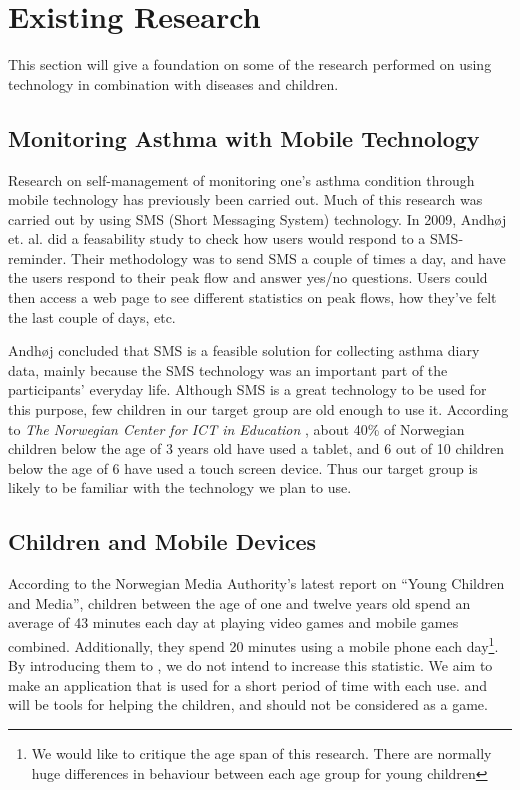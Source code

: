 \section{Existing Research}
\label{sec:existing-research}

This section will give a foundation on some of the research performed on using technology in combination with diseases and children. 


\subsection{Monitoring Asthma with Mobile Technology}
\label{sec:monitoringasthma}
Research on self-management of monitoring one's asthma condition through mobile technology has previously been carried out. Much of this research was carried out by using SMS (Short Messaging System) technology. In 2009, Andh\o j  et. al.\cite{anhoj2004feasibility} did a feasability study to check how users would respond to a SMS-reminder. Their methodology was to send SMS a couple of times a day, and have the users respond to their peak flow and answer yes/no questions. Users could then access a web page to see different statistics on peak flows, how they've felt the last couple of days, etc.

Andh\o j \etal{} concluded that SMS is a feasible solution for collecting asthma diary data, mainly because the SMS technology was an important part of the participants' everyday life. Although SMS is a great technology to be used for this purpose, few children in our target group are old enough to use it. According to \emph{The Norwegian Center for ICT in Education} , about 40\% of Norwegian children below the age of 3 years old have used a tablet, and 6 out of 10 children below the age of 6 have used a touch screen device\cite{nrkchilduse}. Thus our target group is likely to be familiar with the technology we plan to use.  


\subsection{Children and Mobile Devices}
\label{sec:childrenandmobiledevices}

According to the Norwegian Media Authority's latest report on ``Young Children and Media'', children between the age of one and twelve years old spend an average of 43 minutes each day at playing video games and mobile games combined\cite{medietilsynetbarn2014}. Additionally, they spend 20 minutes using a mobile phone each day\footnote{We would like to critique the age span of this research. There are normally huge differences in behaviour between each age group for young children}. By introducing them to \app{}, we do not intend to increase this statistic. We aim to make an application that is used for a short period of time with each use. \app{} and \ab{} will be tools for helping the children, and should not be considered as a game.   

